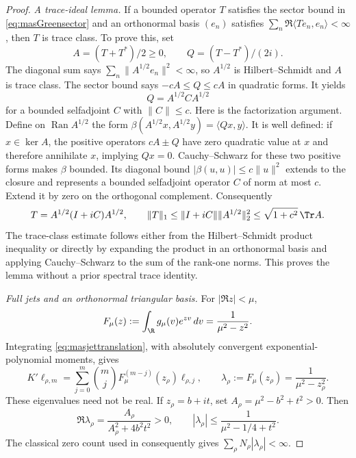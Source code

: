 \begin{proof}
\emph{A trace-ideal lemma.}
If a bounded operator $T$ satisfies the sector bound in \eqref{eq:masGreensector} and an orthonormal basis $(e_n)$ satisfies
$\sum_n\Re\langle Te_n,e_n\rangle<\infty$, then $T$ is trace class. To prove this, set
\[
 A=(T+T^*)/2\ge0,\qquad Q=(T-T^*)/(2i).
\]
The diagonal sum says
$\sum_n\|A^{1/2}e_n\|^2<\infty$, so $A^{1/2}$ is Hilbert--Schmidt and $A$ is trace class. The sector bound says $-cA\le Q\le cA$ in quadratic forms. It yields
\[
 Q=A^{1/2}CA^{1/2}
\]
for a bounded selfadjoint $C$ with $\|C\|\le c$. Here is the factorization argument. Define on $\operatorname{Ran}A^{1/2}$ the form
$\beta(A^{1/2}x,A^{1/2}y)=\langle Qx,y\rangle$.
It is well defined: if $x\in\ker A$, the positive operators $cA\pm Q$ have zero quadratic value at $x$ and therefore annihilate $x$, implying $Qx=0$. Cauchy--Schwarz for these two positive forms makes $\beta$ bounded. Its diagonal bound
$|\beta(u,u)|\le c\|u\|^2$ extends to the closure and represents a bounded selfadjoint operator $C$ of norm at most $c$. Extend it by zero on the orthogonal complement. Consequently
\[
 T=A^{1/2}(I+iC)A^{1/2},\qquad
 \|T\|_1\le\|I+iC\|\|A^{1/2}\|_2^2
 \le\sqrt{1+c^2}\,\Tr A.
\]
The trace-class estimate follows either from the Hilbert--Schmidt product inequality or directly by expanding the product in an orthonormal basis and applying Cauchy--Schwarz to the sum of the rank-one norms. This proves the lemma without a prior spectral trace identity.

\emph{Full jets and an orthonormal triangular basis.}
For $|\Re z|<\mu$,
\[
 F_\mu(z):=\int_{\R}g_\mu(v)e^{zv}\,dv
 =\frac1{\mu^2-z^2}.
\]
Integrating \eqref{eq:masjettranslation}, with absolutely convergent exponential-polynomial moments, gives
\[
 K'\ell_{\rho,m}
 =\sum_{j=0}^m\binom{m}{j}
 F_\mu^{(m-j)}(z_\rho)\ell_{\rho,j},
 \qquad \lambda_\rho:=F_\mu(z_\rho)=\frac1{\mu^2-z_\rho^2}.
\]
These eigenvalues need not be real. If $z_\rho=b+it$, set $A_\rho=\mu^2-b^2+t^2>0$. Then
\[
 \Re\lambda_\rho=\frac{A_\rho}{A_\rho^2+4b^2t^2}>0,
 \qquad |\lambda_\rho|\le\frac1{\mu^2-1/4+t^2}.
\]
The classical zero count used in  consequently gives
$\sum_\rho N_\rho|\lambda_\rho|<\infty$.


\end{proof}
